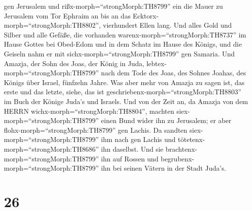 gen Jerusalem und rißx-morph=``strongMorph:TH8799'' ein die Mauer zu
Jerusalem vom Tor Ephraim an bis an das
Ecktorx-morph=``strongMorph:TH8802'', vierhundert Ellen lang.
 Und alles Gold und Silber und alle Gefäße, die vorhanden
warenx-morph=``strongMorph:TH8737'' im Hause Gottes bei Obed-Edom und in
dem Schatz im Hause des Königs, und die Geiseln nahm er mit
sichx-morph=``strongMorph:TH8799'' gen Samaria.  Und
Amazja, der Sohn des Joas, der König in Juda,
lebtex-morph=``strongMorph:TH8799'' nach dem Tode des Joas, des Sohnes
Joahas, des Königs über Israel, fünfzehn Jahre.  Was aber
mehr von Amazja zu sagen ist, das erste und das letzte, siehe, das ist
geschriebenx-morph=``strongMorph:TH8803'' im Buch der Könige Juda's und
Israels.  Und von der Zeit an, da Amazja von dem HERRN
wichx-morph=``strongMorph:TH8804'', machten
siex-morph=``strongMorph:TH8799'' einen Bund wider ihn zu Jerusalem; er
aber flohx-morph=``strongMorph:TH8799'' gen Lachis. Da sandten
siex-morph=``strongMorph:TH8799'' ihm nach gen Lachis und
tötetenx-morph=``strongMorph:TH8686'' ihn daselbst.  Und
sie brachtenx-morph=``strongMorph:TH8799'' ihn auf Rossen und
begrubenx-morph=``strongMorph:TH8799'' ihn bei seinen Vätern in der
Stadt Juda's.

\hypertarget{section-25}{%
\section{26}\label{section-25}}

